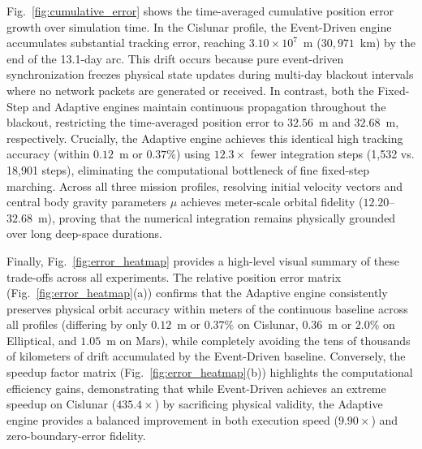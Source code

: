 \documentclass[a4paper,fleqn]{cas-sc}
\begin{document}
Fig.~\ref{fig:cumulative_error} shows the time-averaged cumulative position error growth over simulation time. In the Cislunar profile, the Event-Driven engine accumulates substantial tracking error, reaching $3.10 \times 10^7$~m ($30,971$~km) by the end of the 13.1-day arc. This drift occurs because pure event-driven synchronization freezes physical state updates during multi-day blackout intervals where no network packets are generated or received. In contrast, both the Fixed-Step and Adaptive engines maintain continuous propagation throughout the blackout, restricting the time-averaged position error to $32.56$~m and $32.68$~m, respectively. Crucially, the Adaptive engine achieves this identical high tracking accuracy (within $0.12$~m or $0.37\%$) using $12.3\times$ fewer integration steps (1,532 vs. 18,901 steps), eliminating the computational bottleneck of fine fixed-step marching. Across all three mission profiles, resolving initial velocity vectors and central body gravity parameters $\mu$ achieves meter-scale orbital fidelity ($12.20$--$32.68$~m), proving that the numerical integration remains physically grounded over long deep-space durations.

Finally, Fig.~\ref{fig:error_heatmap} provides a high-level visual summary of these trade-offs across all experiments. The relative position error matrix (Fig.~\ref{fig:error_heatmap}(a)) confirms that the Adaptive engine consistently preserves physical orbit accuracy within meters of the continuous baseline across all profiles (differing by only $0.12$~m or $0.37\%$ on Cislunar, $0.36$~m or $2.0\%$ on Elliptical, and $1.05$~m on Mars), while completely avoiding the tens of thousands of kilometers of drift accumulated by the Event-Driven baseline. Conversely, the speedup factor matrix (Fig.~\ref{fig:error_heatmap}(b)) highlights the computational efficiency gains, demonstrating that while Event-Driven achieves an extreme speedup on Cislunar ($435.4\times$) by sacrificing physical validity, the Adaptive engine provides a balanced improvement in both execution speed ($9.90\times$) and zero-boundary-error fidelity.
\end{document}
